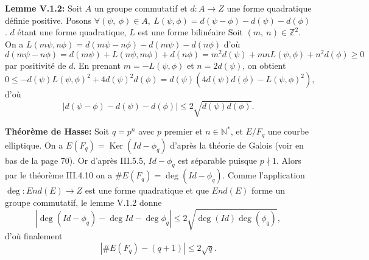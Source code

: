 \documentclass[a4paper,11pt]{article}
\DeclareMathOperator{\Ker}{Ker}
\begin{document}
\textbf{Lemme V.1.2:} Soit $A$ un groupe commutatif et $d: A \to Z$ une forme quadratique définie positive. Posons
$\forall (\psi,~ \phi) \in A,~ L(\psi, \phi) = d(\psi - \phi) - d(\psi) - d(\phi)$. $d$ étant une forme quadratique,
$L$ est une forme bilinéaire\newline
Soit $(m,~ n) \in \mathbb{Z}^2$. On a $L(m\psi, n\phi) = d(m\psi - n\phi) - d(m\psi) - d(n\phi)$ d’où
$d(m\psi - n\phi) = d(m\psi) + L(n\psi, m\phi) + d(n\phi) = m^2d(\psi) + mnL(\psi, \phi) + n^2d(\phi) \geq 0$ par
positivité de $d$. En prenant $m = -L(\psi, \phi)$ et $n = 2d(\psi)$, on obtient
$$0 \leq - d(\psi)L(\psi, \phi)^2 + 4d(\psi)^2d(\phi) = d(\psi)(4d(\psi)d(\phi) - L(\psi, \phi)^2),$$
d’où
$$|d(\psi - \phi) - d(\psi) - d(\phi)| \leq 2\sqrt{d(\psi)d(\phi)}.$$

\vspace{5mm}

\textbf{Théorème de Hasse:} Soit $q = p^n$ avec $p$ premier et $n \in \mathbb{N}^*$, et $E/F_q$ une courbe elliptique.\newline
On a $E(F_q) = \Ker(Id - \phi_q)$ d’après la théorie de Galois (voir en bas de la page 70). Or d’après III.5.5,
$Id - \phi_q$ est séparable puisque $p \nmid 1$. Alors par le théorème III.4.10 on a
$\#E(F_q) = \deg(Id-\phi_q)$. Comme l'application $\deg: End(E) \to Z$ est une forme quadratique et que $End(E)$
forme un groupe commutatif, le lemme V.1.2 donne
$$|\deg(Id-\phi_q) - \deg Id - \deg \phi_q| \leq 2\sqrt{\deg(Id)\deg(\phi_q)},$$
d’où finalement
$$|\#E(F_q) - (q + 1)| \leq 2\sqrt{q}.$$
\end{document}
